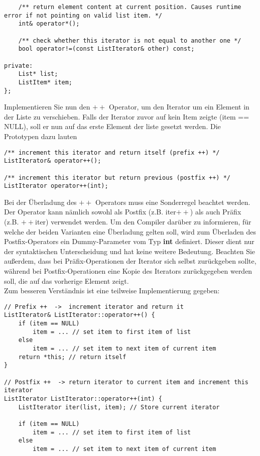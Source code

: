 \documentclass[
  accentcolor=tud1c,	%
  colorbacktitle,		%
  inverttitle,			%
  german,				%
  twoside
]{tudexercise}
\begin{document}
\begin{enumerate}
\begin{lstlisting}
	/** return element content at current position. Causes runtime error if not pointing on valid list item. */
	int& operator*();

	/** check whether this iterator is not equal to another one */
	bool operator!=(const ListIterator& other) const;

private:
	List* list;
	ListItem* item;
};
\end{lstlisting} 


Implementieren Sie nun den \textbf{$++$} Operator, um den Iterator um ein Element in der Liste zu verschieben. Falls der Iterator zuvor auf kein Item zeigte (item == NULL), soll er nun auf das erste Element der liste gesetzt werden. Die Prototypen dazu lauten
\begin{lstlisting}
/** increment this iterator and return itself (prefix ++) */
ListIterator& operator++();
	
/** increment this iterator but return previous (postfix ++) */
ListIterator operator++(int);
\end{lstlisting} 

Bei der Überladung des \textbf{$++$} Operators muss eine Sonderregel beachtet werden. Der Operator kann nämlich sowohl als Postfix (z.B. iter$++$) als auch Präfix (z.B. $++$iter) verwendet werden. Um den Compiler darüber zu informieren, für welche der beiden Varianten eine Überladung gelten soll, wird zum Überladen des Postfix-Operators ein Dummy-Parameter vom Typ \textbf{int} definiert. Dieser dient nur der syntaktischen Unterscheidung und hat keine weitere Bedeutung. Beachten Sie außerdem, dass bei Präfix-Operationen der Iterator sich selbst zurückgeben sollte, während bei Postfix-Operationen eine Kopie des Iterators zurückgegeben werden soll, die auf das vorherige Element zeigt. \\

Zum besseren Verständnis ist eine teilweise Implementierung gegeben: 

\begin{lstlisting}
// Prefix ++  ->  increment iterator and return it
ListIterator& ListIterator::operator++() {
	if (item == NULL)
		item = ... // set item to first item of list
	else
		item = ... // set item to next item of current item
	return *this; // return itself
}

// Postfix ++  -> return iterator to current item and increment this iterator
ListIterator ListIterator::operator++(int) {
	ListIterator iter(list, item); // Store current iterator 
	
	if (item == NULL)
		item = ... // set item to first item of list
	else
		item = ... // set item to next item of current item
	

\end{lstlisting}
\end{enumerate}
\end{document}
